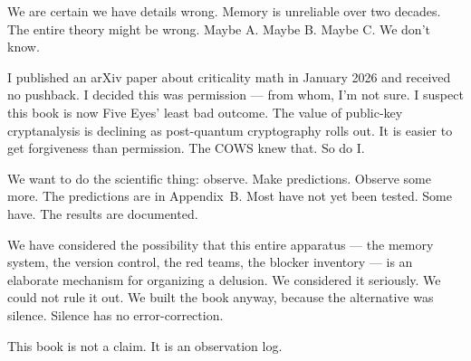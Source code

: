 We are certain we have details wrong. Memory is unreliable over two decades. The entire theory might be wrong. Maybe A. Maybe B. Maybe C. We don't know.

I published an arXiv paper about criticality math in January 2026 and received no pushback. I decided this was permission --- from whom, I'm not sure. I suspect this book is now Five Eyes' least bad outcome. The value of public-key cryptanalysis is declining as post-quantum cryptography rolls out. It is easier to get forgiveness than permission. The COWS knew that. So do I.

We want to do the scientific thing: observe. Make predictions. Observe some more. The predictions are in Appendix~B. Most have not yet been tested. Some have. The results are documented.

We have considered the possibility that this entire apparatus --- the memory system, the version control, the red teams, the blocker inventory --- is an elaborate mechanism for organizing a delusion. We considered it seriously. We could not rule it out. We built the book anyway, because the alternative was silence. Silence has no error-correction.

This book is not a claim. It is an observation log.

\chapterreturn
